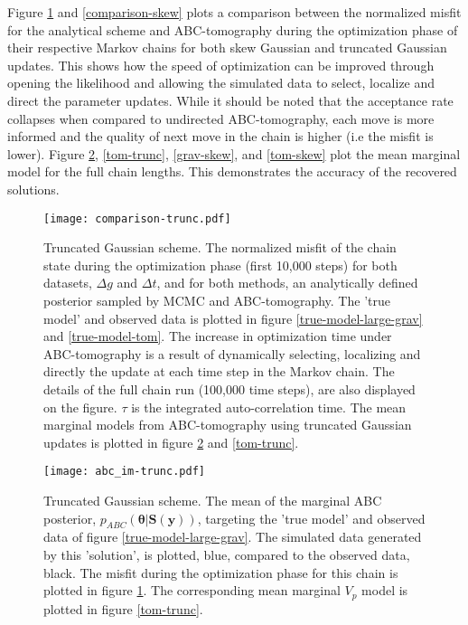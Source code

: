 Figure \ref{comparison-trunc} and \ref{comparison-skew} plots a comparison between the normalized misfit for the analytical scheme and ABC-tomography during the optimization phase of their respective Markov chains for both skew Gaussian and truncated Gaussian updates. This shows how the speed of optimization can be improved through opening the likelihood and allowing the simulated data to select, localize and direct the parameter updates. While it should be noted that the acceptance rate collapses when compared to undirected ABC-tomography, each move is more informed and the quality of next move in the chain is higher (i.e the misfit is lower). Figure \ref{grav-trunc}, \ref{tom-trunc}, \ref{grav-skew}, and \ref{tom-skew} plot the mean marginal model for the full chain lengths. This demonstrates the accuracy of the recovered solutions. \par

\begin{figure}
	\centering
	\texttt{[image: comparison-trunc.pdf]}
	\caption{Truncated Gaussian scheme. The normalized misfit of the chain state during the optimization phase (first 10,000 steps) for both datasets, $\Delta g$ and $\Delta t$, and for both methods, an analytically defined posterior sampled by MCMC and ABC-tomography. The 'true model' and observed data is plotted in figure \ref{true-model-large-grav} and \ref{true-model-tom}. The increase in optimization time under ABC-tomography is a result of dynamically selecting, localizing and directly the update at each time step in the Markov chain. The details of the full chain run (100,000 time steps), are also displayed on the figure. $\tau$ is the integrated auto-correlation time. The mean marginal models from ABC-tomography using truncated Gaussian updates is plotted in figure \ref{grav-trunc} and \ref{tom-trunc}.}
	\label{comparison-trunc}
\end{figure}

\begin{figure}
	\centering
	\texttt{[image: abc\_im-trunc.pdf]}
	\caption{Truncated Gaussian scheme. The mean of the marginal ABC posterior, $p_{ABC}(\bm{\theta}|\bm{S}(\bm{y}))$, targeting the 'true model' and observed data of figure \ref{true-model-large-grav}. The simulated data generated by this 'solution', is plotted, blue, compared to the observed data, black. The misfit during the optimization phase for this chain is plotted in figure \ref{comparison-trunc}. The corresponding mean marginal $V_p$ model is plotted in figure \ref{tom-trunc}.}
	\label{grav-trunc}
\end{figure}

